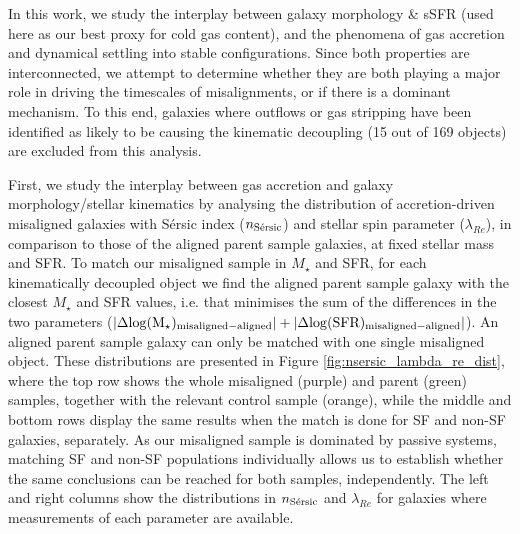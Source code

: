 \documentclass[fleqn,usenatbib]{mnras}
\begin{document}
In this work, we study the interplay between galaxy morphology \& sSFR (used here as our best proxy for cold gas content), and the phenomena of gas accretion and dynamical settling into stable configurations. Since both properties are interconnected, we attempt to determine whether they are both playing a major role in driving the timescales of misalignments, or if there is a dominant mechanism. To this end, galaxies where outflows or gas stripping have been identified as likely to be causing the kinematic decoupling (15 out of 169 objects) are excluded from this analysis.

First, we study the interplay between gas accretion and galaxy morphology/stellar kinematics by analysing the distribution of accretion-driven misaligned galaxies with S\'ersic index ($n_{\rm{S\Acute{e}rsic}}$) and stellar spin parameter ($\lambda_{Re}$), in comparison to those of the aligned parent sample galaxies, at fixed stellar mass and SFR. 
To match our misaligned sample in $M_{\star}$ and SFR, for each kinematically decoupled object we find the aligned parent sample galaxy  with the closest $M_{\star}$ and SFR values, i.e. that minimises the sum of the differences in the two parameters ($|\Delta \rm{log}(M_{\star})_{\rm{misaligned-aligned}}|+|\Delta \rm{log}(SFR)_{\rm{misaligned-aligned}}|$). An aligned parent sample galaxy can only be matched with one single misaligned object. 
These distributions are presented in Figure \ref{fig:nsersic_lambda_re_dist}, where the top row shows the whole misaligned (purple) and parent (green) samples, together with the relevant control sample (orange), while the middle and bottom rows display the same results when the match is done for SF and non-SF galaxies, separately. As our misaligned sample is dominated by passive systems, matching SF and non-SF populations individually allows us to establish whether the same conclusions can be reached for both samples, independently. The left and right columns show the distributions in $n_{\rm{S\Acute{e}rsic}}$ and $\lambda_{Re}$ for galaxies where measurements of each parameter are available. 
\end{document}

